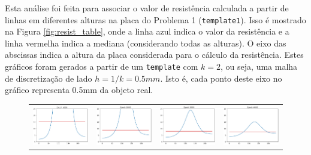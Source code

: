 \documentclass{aleph-revista}
\begin{document}
Esta análise foi feita para associar o valor de resistência calculada a partir de linhas em diferentes alturas na placa do Problema 1 (\texttt{template1}). Isso é mostrado na Figura \ref{fig:resist_table}, onde a linha azul indica o valor da resistência e a linha vermelha indica a mediana (considerando todas as alturas). O eixo das abscissas indica a altura da placa considerada para o cálculo da resistência. Estes gráficos foram gerados a partir de um \texttt{template} com $k=2$, ou seja, uma malha de discretização de lado $h=1/k=0.5 mm$. Isto é, cada ponto deste eixo no gráfico representa 0.5mm da objeto real.

\begin{figure}[!ht]
  \begin{tabular}{cccc}
    \includegraphics[width=0.22\linewidth]{res_1000}  &
    \includegraphics[width=0.22\linewidth]{res_2000}  &
    \includegraphics[width=0.22\linewidth]{res_3000}  &
    \includegraphics[width=0.22\linewidth]{res_4000}    \\


\end{tabular}
\end{figure}
\end{document}
